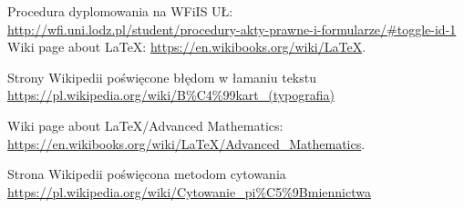 \documentclass[twoside]{wfiisul}
\begin{document}
\clearpage
\tableofcontents

 Procedura dyplomowania na WFiIS UŁ:
\url{http://wfi.uni.lodz.pl/student/procedury-akty-prawne-i-formularze/#toggle-id-1}
 Wiki page about LaTeX: \url{https://en.wikibooks.org/wiki/LaTeX}.

 Strony Wikipedii poświęcone błędom w łamaniu tekstu\\
\url{https://pl.wikipedia.org/wiki/B%C4%99kart_(typografia)}

 Wiki page about LaTeX/Advanced Mathematics: \url{https://en.wikibooks.org/wiki/LaTeX/Advanced_Mathematics}.

 Strona Wikipedii poświęcona metodom cytowania \\
\url{https://pl.wikipedia.org/wiki/Cytowanie_pi%C5%9Bmiennictwa}
\end{document}
